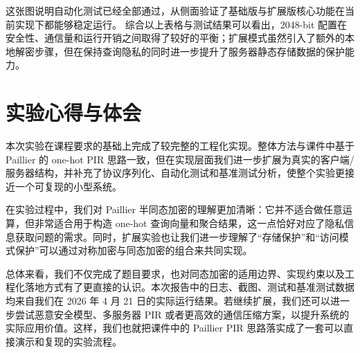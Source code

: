 \documentclass[UTF8,a4paper,10pt]{ctexart}
\begin{document}
这张图说明自动化测试已经全部通过，从侧面验证了基础版与扩展版核心功能在当前实现下都能够稳定运行。
综合以上表格与测试结果可以看出，2048-bit 配置在安全性、通信量和运行开销之间取得了较好的平衡；扩展模式虽然引入了额外的本地解密步骤，但在保持查询隐私的同时进一步提升了服务器静态存储数据的保护能力。

\section{实验心得与体会}
本次实验在课程要求的基础上完成了较完整的工程化实现。整体方法与课件中基于 Paillier 的 one-hot PIR 思路一致，但在实现层面我们进一步扩展为真实的客户端/服务器结构，并补充了协议序列化、自动化测试和基准测试分析，使整个实验更接近一个可复现的小型系统。

在实验过程中，我们对 Paillier 半同态加密的理解更加清晰：它并不适合做任意运算，但非常适合用于构造 one-hot 查询向量和聚合结果，这一点恰好对应了隐私信息获取问题的需求。同时，扩展实验也让我们进一步理解了“存储保护”和“访问模式保护”可以通过对称加密与同态加密的组合来共同实现。

总体来看，我们不仅完成了题目要求，也对同态加密的适用边界、实现约束以及工程化落地方式有了更直接的认识。本次报告中的日志、截图、测试和基准测试数据均来自我们在 2026 年 4 月 21 日的实际运行结果。若继续扩展，我们还可以进一步尝试恶意安全模型、多服务器 PIR 或者更高效的通信压缩方案，以提升系统的实际应用价值。这样，我们也就把课件中的 Paillier PIR 思路落实成了一套可以直接演示和复现的实验流程。
\end{document}
